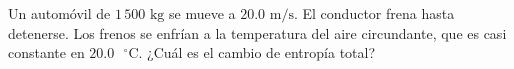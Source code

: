 \item Un automóvil de $1\,500\text{ kg}$ se mueve a $20.0\text{ m/s}$. El conductor frena hasta detenerse. Los frenos se enfrían a la temperatura del aire circundante, que es casi constante en $20.0\text{ }^\circ\text{C}$. ¿Cuál es el cambio de entropía total?
